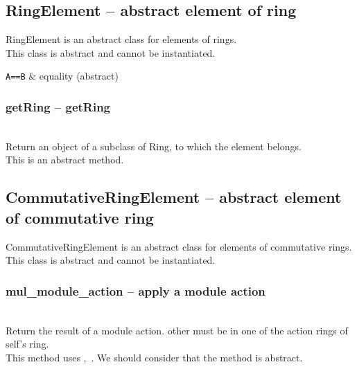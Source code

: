  \subsection{\negok RingElement -- abstract element of ring}
  \quad RingElement is an abstract class for elements of rings.\\
  \spacing
  This class is abstract and cannot be instantiated.\\
  \begin{op}
    \verb+A==B+ & equality (abstract) \\
  \end{op}
  \method
 \subsubsection{getRing -- getRing}
   \\
   \spacing
   \quad Return an object of a subclass of Ring,
        to which the element belongs.\\
   \spacing
   \quad  This is an abstract method.\\
   \spacing
\C

 \subsection{\negok CommutativeRingElement -- abstract element of commutative ring}
  \quad CommutativeRingElement is an abstract class for elements of
    commutative rings.\\
  \spacing
  This class is abstract and cannot be instantiated.\\
  \method
 \subsubsection{mul\_module\_action -- apply a module action}
   \\
   \spacing
   \quad Return the result of a module action.
        other must be in one of the action rings of self's ring.\\
   \spacing
   \quad  This method uses ,\ .
   We should consider that the method is abstract.\\
   \spacing
